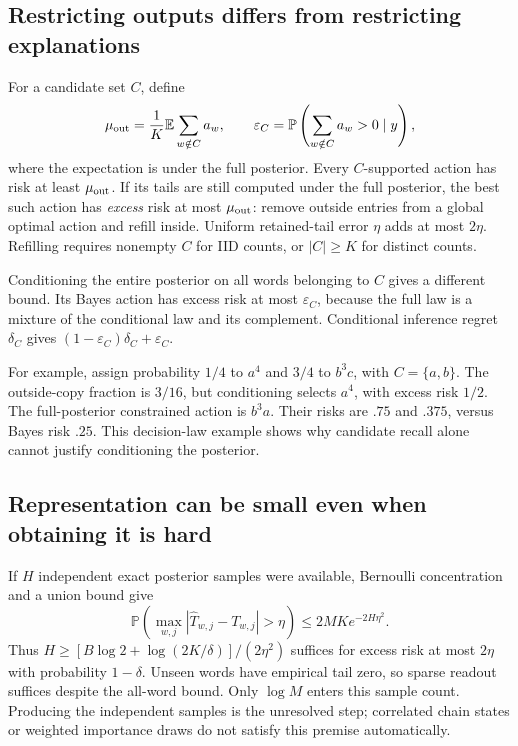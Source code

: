 \documentclass[10pt,a4paper]{article}
\newcommand{\E}{\mathbb E}
\newcommand{\Prb}{\mathbb P}
\begin{document}
\subsection{Restricting outputs differs from restricting explanations}
For a candidate set $C$, define
\[
 \mu_{\rm out}=\frac1K\E\sum_{w\notin C}a_w,\qquad
 \varepsilon_C=\Prb\left(\sum_{w\notin C}a_w>0\mid y\right),
\]
where the expectation is under the full posterior. Every $C$-supported action has risk at least
$\mu_{\rm out}$. If its tails are still computed under the full posterior, the best such action has
\emph{excess} risk at most $\mu_{\rm out}$: remove outside entries from a global optimal action and refill
inside. Uniform retained-tail error $\eta$ adds at most $2\eta$. Refilling requires nonempty $C$ for IID
counts, or $|C|\geq K$ for distinct counts.

Conditioning the entire posterior on all words belonging to $C$ gives a different bound. Its Bayes action
has excess risk at most $\varepsilon_C$, because the full law is a mixture of the conditional law and
its complement. Conditional inference regret $\delta_C$ gives
$(1-\varepsilon_C)\delta_C+\varepsilon_C$.

For example, assign probability $1/4$ to $a^4$ and $3/4$ to $b^3c$, with $C=\{a,b\}$.
The outside-copy fraction is $3/16$, but conditioning selects $a^4$, with excess risk $1/2$.
The full-posterior constrained action is $b^3a$. Their risks are $.75$ and $.375$, versus Bayes risk $.25$.
This decision-law example shows why candidate recall alone cannot justify conditioning the posterior.

\subsection{Representation can be small even when obtaining it is hard}
If $H$ independent exact posterior samples were available, Bernoulli concentration and a union bound give
\begin{equation}
 \Prb\left(\max_{w,j}|\widehat T_{w,j}-T_{w,j}|>\eta\right)\leq2MK e^{-2H\eta^2}.
 \label{eq:uniformtails}
\end{equation}
Thus $H\geq[B\log2+\log(2K/\delta)]/(2\eta^2)$ suffices for excess risk at most $2\eta$ with probability
$1-\delta$. Unseen words have empirical tail zero, so sparse readout suffices despite the all-word bound.
Only $\log M$ enters this sample count. Producing the independent samples is the unresolved step;
correlated chain states or weighted importance draws do not satisfy this premise automatically.
\end{document}
